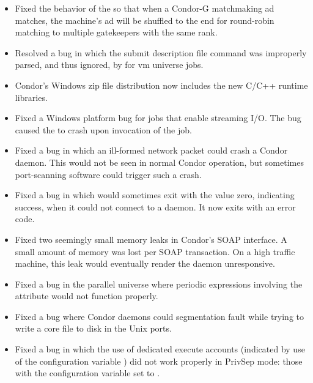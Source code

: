\begin{itemize}
\item Fixed the behavior of the  so that when a
  Condor-G matchmaking ad matches, the machine's ad will be shuffled
  to the end for round-robin matching to multiple gatekeepers with the
  same rank.

\item Resolved a bug in which the submit description file command
   was improperly parsed,
  and thus ignored, by  for vm universe jobs.

\item Condor's Windows zip file distribution now includes the new
  C/C++ runtime libraries.

\item Fixed a Windows platform bug for jobs that enable streaming I/O.
  The bug caused the  to crash upon invocation of the
  job.

\item Fixed a bug in which an ill-formed network packet could crash a
Condor daemon.  This would not be seen in normal Condor operation, but
sometimes port-scanning software could trigger such a crash.

\item Fixed a bug in which  would sometimes exit with 
  the value zero, indicating success,
  when it could not connect to a  daemon.
  It now exits with an error code.

\item Fixed two seemingly small memory leaks in Condor's SOAP
interface. A small amount of memory was lost per SOAP transaction. On
a high traffic machine, this leak would eventually render the
 daemon unresponsive.

\item Fixed a bug in the parallel universe where periodic expressions
involving the  attribute would not function properly.

\item Fixed a bug where Condor daemons could segmentation fault while trying
to write a core file to disk in the Unix ports.

\item Fixed a bug in which the use of dedicated execute accounts
(indicated by use of the configuration variable
) did not work properly
in PrivSep mode: those with the configuration variable
 set to .


\end{itemize}
